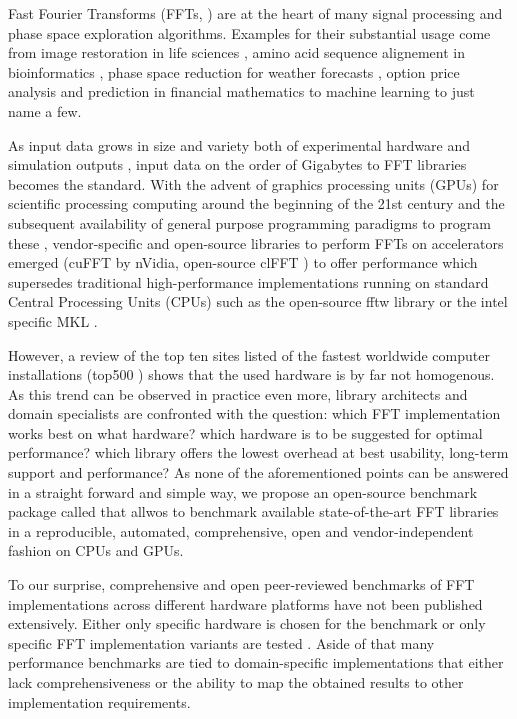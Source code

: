 Fast Fourier Transforms (FFTs, \cite{van1992computational}) are at the heart of many signal processing and phase space exploration algorithms. Examples for their substantial usage come from image restoration in life sciences \cite{preibisch2014efficient,schmid2015real}, amino acid sequence alignement in bioinformatics \cite{katoh2002mafft}, phase space reduction for weather forecasts \cite{maronga2015parallelized}, option price analysis and prediction in financial mathematics \cite{dempster2002spread,hurd2010fourier} to machine learning \cite{collobert2011torch7,jia2014caffe,abadi2016tensorflow} to just name a few.

As input data grows in size and variety both of experimental hardware \cite{huisken2004optical} and simulation outputs \cite{maronga2015parallelized}, input data on the order of Gigabytes to FFT libraries becomes the standard. With the advent of graphics processing units (GPUs) for scientific processing computing around the beginning of the 21st century and the subsequent availability of general purpose programming paradigms to program these \cite{du2012cuda}, vendor-specific and open-source libraries to perform FFTs on accelerators emerged (cuFFT \cite{nvidia2010cufft} by nVidia, open-source clFFT \cite{clfft}) to offer performance which supersedes traditional high-performance implementations running on standard Central Processing Units (CPUs) such as the open-source fftw library \cite{FFTW97,FFTW05} or the intel specific MKL \cite{intel2007intel}.

However, a review of the top ten sites listed of the fastest worldwide computer installations (top500 \cite{meuer2011top500}) shows that the used hardware is by far not homogenous. As this trend can be observed in practice even more, library architects and domain specialists are confronted with the question: which FFT implementation works best on what hardware? which hardware is to be suggested for optimal performance? which library offers the lowest overhead at best usability, long-term support and performance? As none of the aforementioned points can be answered in a straight forward and simple way, we propose an open-source benchmark package called \gearshifft{} \cite{gearshifft_github} that allwos to benchmark available state-of-the-art FFT libraries in a reproducible, automated, comprehensive, open and vendor-independent fashion on CPUs and GPUs.

To our surprise, comprehensive and open peer-reviewed benchmarks of FFT implementations across different hardware platforms have not been published extensively. Either only specific hardware is chosen for the benchmark \cite{park2015fast,eleftheriou2005performance} or only specific FFT implementation variants are tested \cite{shoc2010,dongarra2013hpc}. Aside of that many performance benchmarks are tied to domain-specific implementations \cite{fialka2006fft} that either lack comprehensiveness or the ability to map the obtained results to other implementation requirements.

